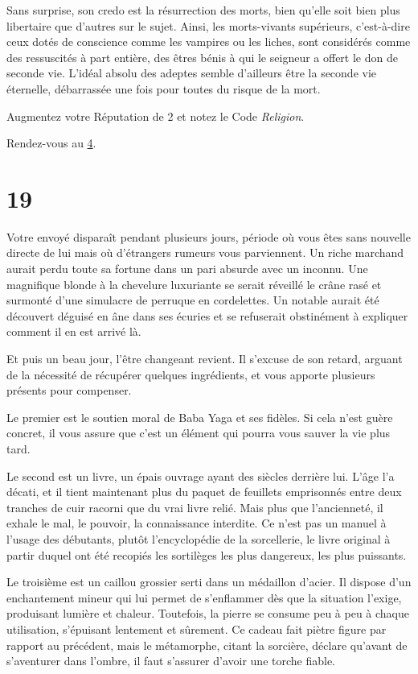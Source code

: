 \documentclass{report}
\newcommand{\gsection}[1]{
    \section{#1}
    \label{section-#1}
}
\newcommand{\glink}[1]{\hyperref[section-#1]{#1}}
\begin{document}
Sans surprise, son credo est la résurrection des morts, bien qu'elle soit bien plus libertaire que d'autres sur le sujet. Ainsi, les morts-vivants supérieurs, c'est-à-dire ceux dotés de conscience comme les vampires ou les liches, sont considérés comme des ressuscités à part entière, des êtres bénis à qui le seigneur a offert le don de seconde vie. L'idéal absolu des adeptes semble d'ailleurs être la seconde vie éternelle, débarrassée une fois pour toutes du risque de la mort.

Augmentez votre Réputation de 2 et notez le Code \emph{Religion}.

Rendez-vous au \glink{4}.

\gsection{19}

Votre envoyé disparaît pendant plusieurs jours, période où vous êtes sans nouvelle directe de lui mais où d'étrangers rumeurs vous parviennent. Un riche marchand aurait perdu toute sa fortune dans un pari absurde avec un inconnu. Une magnifique blonde à la chevelure luxuriante se serait réveillé le crâne rasé et surmonté d'une simulacre de perruque en cordelettes. Un notable aurait été découvert déguisé en âne dans ses écuries et se refuserait obstinément à expliquer comment il en est arrivé là.

Et puis un beau jour, l'être changeant revient. Il s'excuse de son retard, arguant de la nécessité de récupérer quelques ingrédients, et vous apporte plusieurs présents pour compenser.

Le premier est le soutien moral de Baba Yaga et ses fidèles. Si cela n'est guère concret, il vous assure que c'est un élément qui pourra vous sauver la vie plus tard.

Le second est un livre, un épais ouvrage ayant des siècles derrière lui. L'âge l'a décati, et il tient maintenant plus du paquet de feuillets emprisonnés entre deux tranches de cuir racorni que du vrai livre relié. Mais plus que l'ancienneté, il exhale le mal, le pouvoir, la connaissance interdite. Ce n'est pas un manuel à l'usage des débutants, plutôt l'encyclopédie de la sorcellerie, le livre original à partir duquel ont été recopiés les sortilèges les plus dangereux, les plus puissants.

Le troisième est un caillou grossier serti dans un médaillon d'acier. Il dispose d'un enchantement mineur qui lui permet de s'enflammer dès que la situation l'exige, produisant lumière et chaleur. Toutefois, la pierre se consume peu à peu à chaque utilisation, s'épuisant lentement et sûrement. Ce cadeau fait piètre figure par rapport au précédent, mais le métamorphe, citant la sorcière, déclare qu'avant de s'aventurer dans l'ombre, il faut s'assurer d'avoir une torche fiable.
\end{document}
